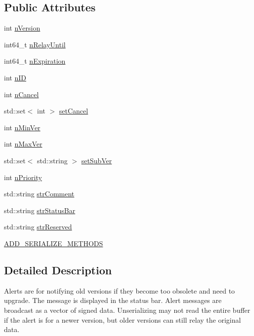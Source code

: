 \subsection*{Public Attributes}
\begin{DoxyCompactItemize}
\item 
int \hyperlink{class_c_unsigned_alert_ad8fad8e8f62caaf8162fad19170de2cf}{n\+Version}
\item 
int64\+\_\+t \hyperlink{class_c_unsigned_alert_a13bb82aef8b496584f6b3ae6424f8e58}{n\+Relay\+Until}
\item 
int64\+\_\+t \hyperlink{class_c_unsigned_alert_af77a9d4d3abc0a0b376a7689059620e8}{n\+Expiration}
\item 
int \hyperlink{class_c_unsigned_alert_a4e11dc713526f6597a20762e707518a0}{n\+I\+D}
\item 
int \hyperlink{class_c_unsigned_alert_a28de8ffcdfea75db2061b2cdc1add04a}{n\+Cancel}
\item 
std\+::set$<$ int $>$ \hyperlink{class_c_unsigned_alert_ab1978ea23d02720d515bcdcf9d0dbdb0}{set\+Cancel}
\item 
int \hyperlink{class_c_unsigned_alert_af7ab540ea7df8e97fbfba7551ec31b1a}{n\+Min\+Ver}
\item 
int \hyperlink{class_c_unsigned_alert_a041bff847e178c132cb4d5234c1f41c8}{n\+Max\+Ver}
\item 
std\+::set$<$ std\+::string $>$ \hyperlink{class_c_unsigned_alert_a1b7148c413e1781222c5748935cad200}{set\+Sub\+Ver}
\item 
int \hyperlink{class_c_unsigned_alert_acf7253ae21d58a8633faab0635f5f5f5}{n\+Priority}
\item 
std\+::string \hyperlink{class_c_unsigned_alert_a8c9cd8c9706c14df3c5d6b9b1ed3b130}{str\+Comment}
\item 
std\+::string \hyperlink{class_c_unsigned_alert_a97cfbf9a49b770bb84e49389ac1489c2}{str\+Status\+Bar}
\item 
std\+::string \hyperlink{class_c_unsigned_alert_a0115109fd39d48f37a412d5f50a78828}{str\+Reserved}
\item 
\hyperlink{class_c_unsigned_alert_a24489988876bbf2c38a5f379e4057a53}{A\+D\+D\+\_\+\+S\+E\+R\+I\+A\+L\+I\+Z\+E\+\_\+\+M\+E\+T\+H\+O\+D\+S}
\end{DoxyCompactItemize}


\subsection{Detailed Description}
Alerts are for notifying old versions if they become too obsolete and need to upgrade. The message is displayed in the status bar. Alert messages are broadcast as a vector of signed data. Unserializing may not read the entire buffer if the alert is for a newer version, but older versions can still relay the original data. 

